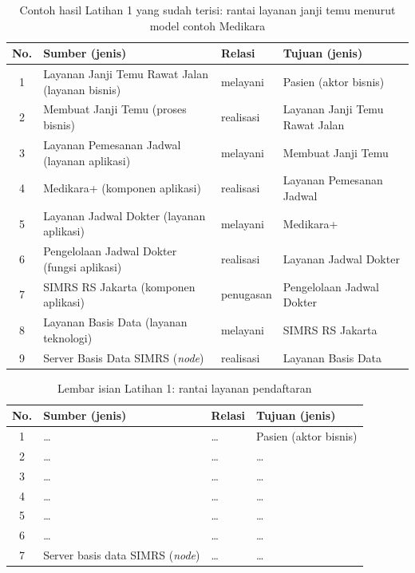 \begin{table}[!htb]
  \centering
  \caption{Contoh hasil Latihan 1 yang sudah terisi: rantai layanan janji
           temu menurut model contoh Medikara}
  \label{tab:ch04-lat1-contoh}
  \small
  \begin{tabularx}{\textwidth}{c>{\raggedright\arraybackslash}X>{\raggedright\arraybackslash}p{1.7cm}>{\raggedright\arraybackslash}X}
    \hline
    \textbf{No.} & \textbf{Sumber (jenis)} & \textbf{Relasi} & \textbf{Tujuan (jenis)} \\
    \hline
    1 & Layanan Janji Temu Rawat Jalan (layanan bisnis) & melayani & Pasien (aktor bisnis) \\
    \hline
    2 & Membuat Janji Temu (proses bisnis) & realisasi & Layanan Janji Temu Rawat Jalan \\
    \hline
    3 & Layanan Pemesanan Jadwal (layanan aplikasi) & melayani & Membuat Janji Temu \\
    \hline
    4 & Medikara+ (komponen aplikasi) & realisasi & Layanan Pemesanan Jadwal \\
    \hline
    5 & Layanan Jadwal Dokter (layanan aplikasi) & melayani & Medikara+ \\
    \hline
    6 & Pengelolaan Jadwal Dokter (fungsi aplikasi) & realisasi & Layanan Jadwal Dokter \\
    \hline
    7 & SIMRS RS Jakarta (komponen aplikasi) & penugasan & Pengelolaan Jadwal Dokter \\
    \hline
    8 & Layanan Basis Data (layanan teknologi) & melayani & SIMRS RS Jakarta \\
    \hline
    9 & Server Basis Data SIMRS (\textit{node}) & realisasi & Layanan Basis Data \\
    \hline
  \end{tabularx}
\end{table}

\begin{table}[!htb]
  \centering
  \caption{Lembar isian Latihan 1: rantai layanan pendaftaran}
  \label{tab:ch04-lat1-hasil}
  \small
  \begin{tabularx}{\textwidth}{c>{\raggedright\arraybackslash}X>{\raggedright\arraybackslash}p{1.7cm}>{\raggedright\arraybackslash}X}
    \hline
    \textbf{No.} & \textbf{Sumber (jenis)} & \textbf{Relasi} & \textbf{Tujuan (jenis)} \\
    \hline
    1 & \dots & \dots & Pasien (aktor bisnis) \\
    \hline
    2 & \dots & \dots & \dots \\
    \hline
    3 & \dots & \dots & \dots \\
    \hline
    4 & \dots & \dots & \dots \\
    \hline
    5 & \dots & \dots & \dots \\
    \hline
    6 & \dots & \dots & \dots \\
    \hline
    7 & Server basis data SIMRS (\textit{node}) & \dots & \dots \\
    \hline
  \end{tabularx}
\end{table}

